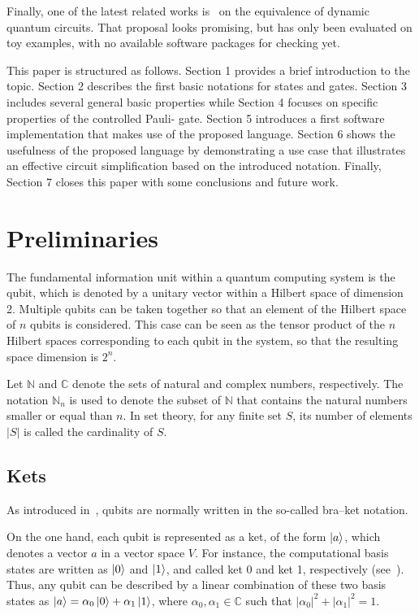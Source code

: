 \documentclass[sigconf,natbib=false]{acmart}
\begin{document}
	Finally, one of the latest related  works is~\cite{Wang21} on the equivalence of dynamic quantum circuits. That proposal looks promising, but has only been evaluated on toy examples, with no available software packages for  checking yet.

	This paper is structured as follows. Section 1 provides a brief introduction to the topic. Section 2 describes the first basic notations for states and gates.  Section 3 includes several  general basic properties  while Section 4 focuses on specific properties of the controlled Pauli- gate. Section 5 introduces a first software implementation that makes use of the proposed language.
	Section 6 shows the usefulness of the proposed language by demonstrating a use case that   illustrates an effective circuit simplification based on the introduced notation.
	Finally, Section 7 closes this paper with some conclusions and future work.

	\section{Preliminaries}
	The fundamental information unit within a quantum computing system is the qubit, which is denoted by a unitary vector within a Hilbert space of dimension 2.
	Multiple qubits can be taken together so that an element of the Hilbert space of $n$ qubits is considered. This case can be seen as the tensor product of the $n$ Hilbert spaces corresponding to each qubit in the system, so that the resulting space dimension is $2^n$.

	Let $\mathbb{N}$ and $\mathbb{C}$ denote the sets of natural and complex numbers, respectively. The notation $\mathbb{N}_n$ is used to denote the subset of $\mathbb{N}$ that contains the natural numbers smaller or equal than $n$.
	In set theory, for any finite set $S$, its number of elements  $|S|$ is called the cardinality of $S$.

	\subsection{Kets}

	As introduced in~\cite{diracBraket},  qubits are normally written in the so-called bra–ket notation.

 On the one hand, each qubit is represented as a ket, of the form $\ket{a}$,  which denotes a vector $a$ in a vector space $V$.
	For instance, the computational basis states are written  as $\ket{0}$ and $\ket{1}$, and called ket 0 and ket 1, respectively (see~\cite{Nielsen_Chuang_2010}).
	Thus, any qubit can be described by a linear combination of these two basis states as $\ket{a} =\alpha_0\ket{0} +\alpha_1 \ket{1}$, where $\alpha_0,  \alpha_1 \in \mathbb{C}$ such that $ |\alpha_0|^{2}+|\alpha_1|^{2}=1$.
\end{document}
